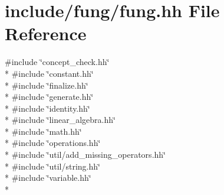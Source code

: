 \hypertarget{fung_8hh}{\section{include/fung/fung.hh File Reference}
\label{fung_8hh}
}
{\ttfamily \#include \char`\"{}concept\-\_\-check.\-hh\char`\"{}}\\*
{\ttfamily \#include \char`\"{}constant.\-hh\char`\"{}}\\*
{\ttfamily \#include \char`\"{}finalize.\-hh\char`\"{}}\\*
{\ttfamily \#include \char`\"{}generate.\-hh\char`\"{}}\\*
{\ttfamily \#include \char`\"{}identity.\-hh\char`\"{}}\\*
{\ttfamily \#include \char`\"{}linear\-\_\-algebra.\-hh\char`\"{}}\\*
{\ttfamily \#include \char`\"{}math.\-hh\char`\"{}}\\*
{\ttfamily \#include \char`\"{}operations.\-hh\char`\"{}}\\*
{\ttfamily \#include \char`\"{}util/add\-\_\-missing\-\_\-operators.\-hh\char`\"{}}\\*
{\ttfamily \#include \char`\"{}util/string.\-hh\char`\"{}}\\*
{\ttfamily \#include \char`\"{}variable.\-hh\char`\"{}}\\*
